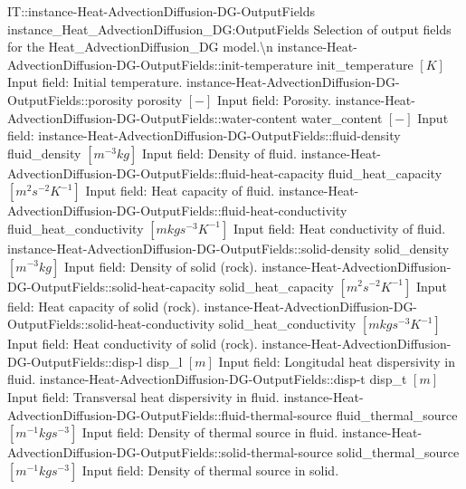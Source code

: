 \begin{SelectionType}
	{IT::instance-Heat-AdvectionDiffusion-DG-OutputFields}
	{instance{\_}Heat{\_}AdvectionDiffusion{\_}DG:OutputFields}
	{{{Selection of output fields for the Heat{\_}AdvectionDiffusion{\_}DG model.{\textbackslash}n}%
}}
		\SelectionItem
			{instance-Heat-AdvectionDiffusion-DG-OutputFields::init-temperature}
			{init{\_}temperature}
			{{{}{$[K]$}{ Input field: Initial temperature.}%
}}
		\SelectionItem
			{instance-Heat-AdvectionDiffusion-DG-OutputFields::porosity}
			{porosity}
			{{{}{$[-]$}{ Input field: Porosity.}%
}}
		\SelectionItem
			{instance-Heat-AdvectionDiffusion-DG-OutputFields::water-content}
			{water{\_}content}
			{{{}{$[-]$}{ Input field: }%
}}
		\SelectionItem
			{instance-Heat-AdvectionDiffusion-DG-OutputFields::fluid-density}
			{fluid{\_}density}
			{{{}{$[m^{-3}kg]$}{ Input field: Density of fluid.}%
}}
		\SelectionItem
			{instance-Heat-AdvectionDiffusion-DG-OutputFields::fluid-heat-capacity}
			{fluid{\_}heat{\_}capacity}
			{{{}{$[m^{2}s^{-2}K^{-1}]$}{ Input field: Heat capacity of fluid.}%
}}
		\SelectionItem
			{instance-Heat-AdvectionDiffusion-DG-OutputFields::fluid-heat-conductivity}
			{fluid{\_}heat{\_}conductivity}
			{{{}{$[mkgs^{-3}K^{-1}]$}{ Input field: Heat conductivity of fluid.}%
}}
		\SelectionItem
			{instance-Heat-AdvectionDiffusion-DG-OutputFields::solid-density}
			{solid{\_}density}
			{{{}{$[m^{-3}kg]$}{ Input field: Density of solid (rock).}%
}}
		\SelectionItem
			{instance-Heat-AdvectionDiffusion-DG-OutputFields::solid-heat-capacity}
			{solid{\_}heat{\_}capacity}
			{{{}{$[m^{2}s^{-2}K^{-1}]$}{ Input field: Heat capacity of solid (rock).}%
}}
		\SelectionItem
			{instance-Heat-AdvectionDiffusion-DG-OutputFields::solid-heat-conductivity}
			{solid{\_}heat{\_}conductivity}
			{{{}{$[mkgs^{-3}K^{-1}]$}{ Input field: Heat conductivity of solid (rock).}%
}}
		\SelectionItem
			{instance-Heat-AdvectionDiffusion-DG-OutputFields::disp-l}
			{disp{\_}l}
			{{{}{$[m]$}{ Input field: Longitudal heat dispersivity in fluid.}%
}}
		\SelectionItem
			{instance-Heat-AdvectionDiffusion-DG-OutputFields::disp-t}
			{disp{\_}t}
			{{{}{$[m]$}{ Input field: Transversal heat dispersivity in fluid.}%
}}
		\SelectionItem
			{instance-Heat-AdvectionDiffusion-DG-OutputFields::fluid-thermal-source}
			{fluid{\_}thermal{\_}source}
			{{{}{$[m^{-1}kgs^{-3}]$}{ Input field: Density of thermal source in fluid.}%
}}
		\SelectionItem
			{instance-Heat-AdvectionDiffusion-DG-OutputFields::solid-thermal-source}
			{solid{\_}thermal{\_}source}
			{{{}{$[m^{-1}kgs^{-3}]$}{ Input field: Density of thermal source in solid.}%
}}
\end{SelectionType}
